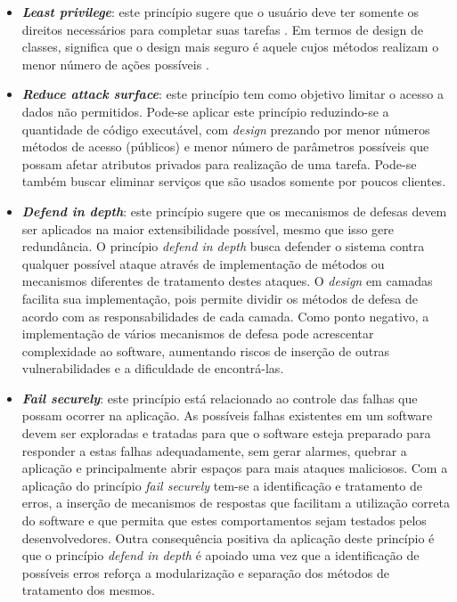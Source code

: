 \begin{itemize}
\item \textbf{\emph{Least privilege}}: este princípio sugere que o usuário deve ter somente os direitos necessários para completar suas tarefas \cite{bishop2003}. Em termos de design de classes, significa que o design mais seguro é aquele cujos métodos realizam o menor número de ações possíveis \cite{a1lshammari2009}.
\item \textbf{\emph{Reduce attack surface}}: este princípio tem como objetivo limitar o acesso a dados não permitidos. Pode-se aplicar este princípio reduzindo-se a quantidade de código executável, com \emph{design} prezando por menor números métodos de acesso (públicos) e menor número de parâmetros possíveis que possam afetar atributos privados para realização de uma tarefa. Pode-se também buscar eliminar serviços que são usados somente por poucos clientes.
\item \textbf{\emph{Defend in depth}}: este princípio sugere que os mecanismos de defesas devem ser aplicados na maior extensibilidade possível, mesmo que isso gere redundância. O princípio \emph{defend in depth} busca defender o sistema contra qualquer possível ataque através de implementação de métodos ou mecanismos diferentes de tratamento destes ataques. O \emph{design} em camadas facilita sua implementação, pois permite dividir os métodos de defesa de acordo com as responsabilidades de cada camada. Como ponto negativo, a implementação de vários mecanismos de defesa pode acrescentar complexidade ao software, aumentando riscos de inserção de outras vulnerabilidades e a dificuldade de encontrá-las.
\item \textbf{\emph{Fail securely}}: este princípio está relacionado ao controle das falhas que possam ocorrer na aplicação. As possíveis falhas existentes em um software devem ser exploradas e tratadas para que o software esteja preparado para responder a estas falhas adequadamente, sem gerar alarmes, quebrar a aplicação e principalmente abrir espaços para mais ataques maliciosos. Com a aplicação do princípio \emph{fail securely} tem-se a identificação e tratamento de erros, a inserção de mecanismos de respostas que facilitam a utilização correta do software e que permita que estes comportamentos sejam testados pelos desenvolvedores. Outra consequência positiva da aplicação deste princípio é que o princípio \emph{defend in depth} é apoiado uma vez que a identificação de possíveis erros reforça a modularização e separação dos métodos de tratamento dos mesmos.

\end{itemize}
